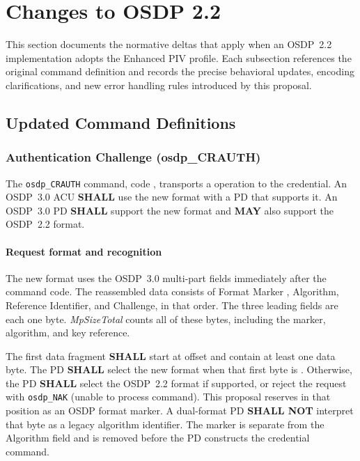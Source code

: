 \section{Changes to OSDP 2.2}\label{sec:osdp22-changes}

This section documents the normative deltas that apply when an OSDP~2.2 implementation adopts the Enhanced PIV profile. Each subsection references the original command definition and records the precise behavioral updates, encoding clarifications, and new error handling rules introduced by this proposal.

\subsection{Updated Command Definitions}

\subsubsection{Authentication Challenge (osdp\_CRAUTH)}

The \texttt{osdp\_CRAUTH} command, code , transports a
 operation to the credential. An OSDP~3.0 ACU
\textbf{SHALL} use the new format with a PD that supports it. An OSDP~3.0
PD \textbf{SHALL} support the new format and \textbf{MAY} also support
the OSDP~2.2 format.

\paragraph{Request format and recognition}
The new format uses the OSDP~3.0 multi-part fields immediately after the
command code. The reassembled data consists of Format Marker ,
Algorithm, Reference Identifier, and Challenge, in that order. The three
leading fields are each one byte. \emph{MpSizeTotal} counts all of these
bytes, including the marker, algorithm, and key reference.

The first data fragment \textbf{SHALL} start at offset  and
contain at least one data byte. The PD \textbf{SHALL} select the new format
when that first byte is . Otherwise, the PD \textbf{SHALL}
select the OSDP~2.2 format if supported, or reject the request with
\texttt{osdp\_NAK}  (unable to process command).
This proposal reserves  in that position as an OSDP format
marker. A dual-format PD \textbf{SHALL NOT} interpret that byte as a
legacy algorithm identifier. The marker is separate from the Algorithm
field and is removed before the PD constructs the credential command.

